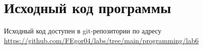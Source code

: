 \section{Исходный код программы}
Исходный код доступен в git-репозитории по адресу \url{https://github.com/FEgor04/labs/tree/main/programming/lab6}
